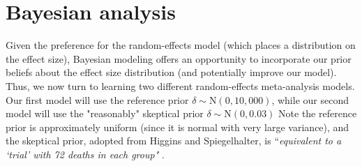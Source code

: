 \documentclass[fleqn,10pt]{SelfArx} %
\begin{document}

\section{Bayesian analysis}

Given the preference for the random-effects model (which places a distribution on the effect size), Bayesian modeling offers an opportunity to incorporate our prior beliefs about the effect size distribution (and potentially improve our model). Thus, we now turn to learning two different random-effects meta-analysis models. Our first model will use the reference prior $\delta \sim \textrm{N}(0, 10,000)$, while our second model will use the "reasonably" skeptical prior $\delta \sim \textrm{N}(0, 0.03)$
Note the reference prior is approximately uniform (since it is normal with very large variance), and the skeptical prior, adopted from Higgins and Spiegelhalter, is ``\emph{equivalent to a `trial' with 72 deaths in each group"} \cite{Original}.
\end{document}
